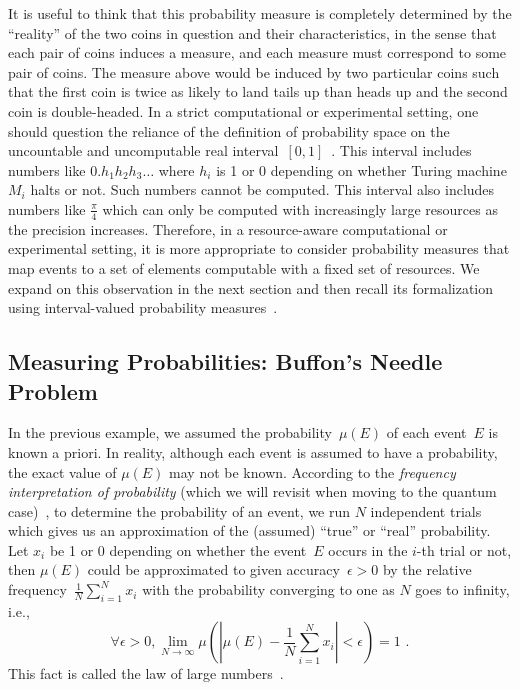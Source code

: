 \documentclass{article}
\theoremstyle{remark}
\newcommand{\pmeas}{\ensuremath{\mu}}
\begin{document}
\noindent It is useful to think that this probability measure is
completely determined by the ``reality'' of the two coins in question
and their characteristics, in the sense that each pair of coins
induces a measure, and each measure must correspond to some pair of
coins. The measure above would be induced by two particular coins such
that the first coin is twice as likely to land tails up than heads up
and the second coin is double-headed. In a strict computational
or experimental setting, one should question the reliance of the
definition of probability space on the uncountable and
uncomputable real
interval~$[0,1]$~\cite{Turing_1937,Ziegler2007,weihrauch2012computable}.
This interval includes numbers like
$0.h_{1}h_{2}h_{3}\ldots$ where $h_{i}$ is 1 or 0 depending on whether
Turing machine $M_{i}$ halts or not. Such numbers cannot be
computed. This interval also includes numbers like $\frac{\pi}{4}$
which can only be computed with increasingly large resources as the
precision increases. Therefore, in a resource-aware computational or
experimental setting, it is more appropriate to consider probability
measures that map events to a set of elements computable with a fixed
set of resources. We expand on this observation in the next section
and then recall its formalization using interval-valued probability
measures~\cite{Weichselberger2000,JamisonLodwick2004}.

\subsection{Measuring Probabilities: Buffon's Needle Problem\label{subsec:Measuring-Probabilities:-Buffon}}

In the previous example, we assumed the probability~$\pmeas(E)$ of
each event~$E$ is known a priori. In reality, although each event is
assumed to have a probability, the exact value of $\pmeas(E)$ may not
be known. According to the \emph{frequency interpretation of
  probability} (which we will revisit when moving to the quantum
case)~\cite{Venn1876,Hajek2012}, 
to determine the probability of an event, we run $N$
independent trials which gives us an approximation of the (assumed)
``true'' or ``real'' probability. Let $x_{i}$ be 1 or 0 depending on
whether the event~$E$ occurs in the $i$-th trial or not, then
$\pmeas(E)$ could be approximated to given accuracy~$\epsilon>0$ by
the relative frequency~$\frac{1}{N}\sum_{i=1}^{N}x_{i}$ with the
probability converging to one as $N$ goes to infinity, i.e.,
\[
\forall\epsilon>0,\lim_{N\rightarrow\infty}\pmeas\left(\left|\pmeas(E)-\frac{1}{N}\sum_{i=1}^{N} x_{i}\right|<\epsilon\right)=1\textrm{ .}
\]
This fact is called the law of large numbers~\cite{Bernoulli2006,Kolmogorov1950,Uspensky1937,Shafer1976,544199}.
\end{document}
